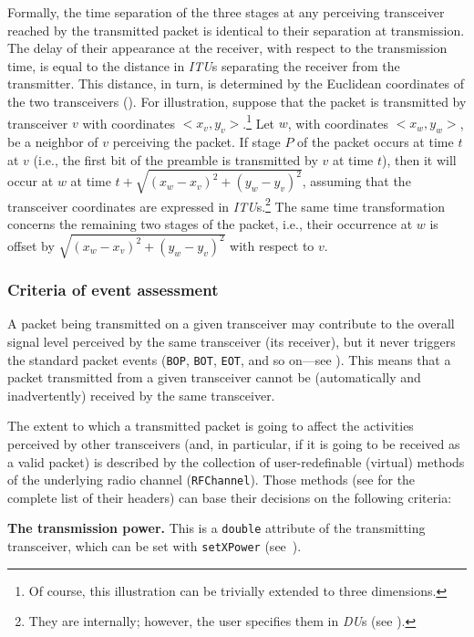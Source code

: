 Formally, the time separation of the three stages at any perceiving
transceiver reached by
the transmitted packet is identical to their separation at transmission.
The delay of their appearance at the receiver, with respect to the transmission
time, is equal to the distance in {\em ITU\/}s separating the
receiver from the transmitter.
This distance, in turn, is determined by the Euclidean coordinates of the
two transceivers ().
For illustration, suppose that the packet is transmitted by transceiver
$v$ with coordinates $<x_v, y_v>$.\footnote{Of course, this illustration
can be trivially extended to three dimensions.}
Let $w$, with coordinates $<x_w, y_w>$, be a neighbor of $v$ perceiving the
packet.
If stage $P$ of the packet occurs at time $t$ at $v$ (i.e., the first bit
of the preamble is transmitted by $v$ at time $t$), then it will occur at
$w$ at time $t+\sqrt{(x_w - x_v)^2 + (y_w - y_v)^2}$, assuming that the
transceiver coordinates are expressed in {\em ITU\/}s.\footnote{They are
internally; however, the user specifies them in {\em DU\/}s
(see ).}
The same time transformation concerns the remaining two stages of the packet,
i.e., their occurrence at $w$ is offset by 
$\sqrt{(x_w - x_v)^2 + (y_w - y_v)^2}$ with respect to $v$.

\subsubsection{Criteria of event assessment}
\label{rm_tr_ra_ca}

A packet being transmitted on a given transceiver may contribute to the
overall signal level perceived by the same transceiver (its receiver),
but it never triggers the standard packet events
({\tt BOP}, {\tt BOT}, {\tt EOT}, and so on---see ).
This means that a packet transmitted from a given transceiver cannot be
(automatically and inadvertently) received by the same transceiver.

The extent to which a transmitted packet is going to affect the activities
perceived by other transceivers (and, in particular, if it is going to be
received as a valid packet) is
described by the collection of user-redefinable (virtual) methods of the
underlying radio channel ({\tt RFChannel}).
Those methods (see  for the complete list of their headers)
can base their decisions on the following criteria:

\noindent
{\bf The transmission power.}
This is a {\tt double} attribute of the transmitting transceiver, which can be
set with {\tt setXPower} (see~).

